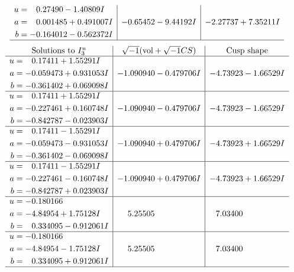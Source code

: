 \documentclass[1p]{elsarticle_modified}
\theoremstyle{definition}
\newcommand{\I}{\sqrt{-1}}
\begin{document}
$$\begin{array}{c|c|c}
\begin{aligned}
u &= \phantom{-}0.27490 - 1.40809 I \\
a &= \phantom{-}0.001485 + 0.491007 I \\
b &= -0.164012 - 0.562372 I\end{aligned}
 & -0.65452 - 9.44192 I & -2.27737 + 7.35211 I\\
 \hline 
 \end{array}$$\newpage$$\begin{array}{c|c|c}  
\text{Solutions to }I^u_{3}& \I (\text{vol} + \sqrt{-1}CS) & \text{Cusp shape}\\
 \hline 
\begin{aligned}
u &= \phantom{-}0.17411 + 1.55291 I \\
a &= -0.059473 + 0.931053 I \\
b &= -0.361402 + 0.069098 I\end{aligned}
 & -1.090940 - 0.479706 I & -4.73923 - 1.66529 I \\ \hline\begin{aligned}
u &= \phantom{-}0.17411 + 1.55291 I \\
a &= -0.227461 + 0.160748 I \\
b &= -0.842787 - 0.023903 I\end{aligned}
 & -1.090940 - 0.479706 I & -4.73923 - 1.66529 I \\ \hline\begin{aligned}
u &= \phantom{-}0.17411 - 1.55291 I \\
a &= -0.059473 - 0.931053 I \\
b &= -0.361402 - 0.069098 I\end{aligned}
 & -1.090940 + 0.479706 I & -4.73923 + 1.66529 I \\ \hline\begin{aligned}
u &= \phantom{-}0.17411 - 1.55291 I \\
a &= -0.227461 - 0.160748 I \\
b &= -0.842787 + 0.023903 I\end{aligned}
 & -1.090940 + 0.479706 I & -4.73923 + 1.66529 I \\ \hline\begin{aligned}
u &= -0.180166\phantom{ +0.000000I} \\
a &= -4.84954 + 1.75128 I \\
b &= \phantom{-}0.334095 - 0.912061 I\end{aligned}
 & \phantom{-}5.25505\phantom{ +0.000000I} & \phantom{-}7.03400\phantom{ +0.000000I} \\ \hline\begin{aligned}
u &= -0.180166\phantom{ +0.000000I} \\
a &= -4.84954 - 1.75128 I \\
b &= \phantom{-}0.334095 + 0.912061 I\end{aligned}
 & \phantom{-}5.25505\phantom{ +0.000000I} & \phantom{-}7.03400\phantom{ +0.000000I}\\
 \hline 
 \end{array}$$\newpage\newpage\renewcommand{\arraystretch}{1}
\end{document}

